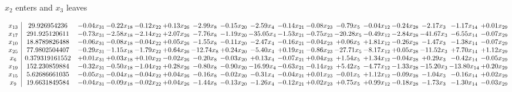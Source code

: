 \documentclass[9pt]{article}
\begin{document}
 $ x_{2} $ enters and $ x_{3} $ leaves 

 \[\begin{array}{c| c c@{\hskip 2pt} c@{\hskip 2pt} c@{\hskip 2pt} c@{\hskip 2pt} c@{\hskip 2pt} c@{\hskip 2pt} c@{\hskip 2pt} c@{\hskip 2pt} c@{\hskip 2pt} c@{\hskip 2pt} c@{\hskip 2pt} c@{\hskip 2pt} c@{\hskip 2pt} c@{\hskip 2pt} c@{\hskip 2pt} }
 x_{13}   &  29.926954236 & -0.04 x_{31} & -0.22 x_{18} & -0.12 x_{22} & +  0.13 x_{26} & -2.99 x_{8} & -0.15 x_{20} & -2.59 x_{4} & -0.14 x_{21} & -0.08 x_{23} & -0.79 x_{5} & -0.04 x_{12} & -0.24 x_{28} & -2.17 x_{3} & -1.17 x_{14} & +  0.01 x_{29}\\
 x_{17}   &  291.925120611 & -0.73 x_{31} & -2.58 x_{18} & -2.14 x_{22} & +  2.07 x_{26} & -7.76 x_{8} & -1.19 x_{20} & -35.05 x_{4} & -1.53 x_{21} & -0.75 x_{23} & -20.28 x_{5} & -0.49 x_{12} & -2.84 x_{28} & -41.67 x_{3} & -6.55 x_{14} & -0.07 x_{29}\\
 x_{10}   &  18.8789826488 & -0.06 x_{31} & -0.08 x_{18} & -0.04 x_{22} & +  0.05 x_{26} & -1.55 x_{8} & -0.11 x_{20} & -2.47 x_{4} & -0.16 x_{21} & -0.04 x_{23} & +  0.06 x_{5} & +  1.81 x_{12} & -0.26 x_{28} & -1.47 x_{3} & -1.38 x_{14} & -0.07 x_{29}\\
 x_{25}   &  77.9802504407 & -0.29 x_{31} & -1.15 x_{18} & -1.79 x_{22} & +  0.64 x_{26} & -12.74 x_{8} & +  0.24 x_{20} & -5.40 x_{4} & +  0.19 x_{21} & -0.86 x_{23} & -27.71 x_{5} & -8.17 x_{12} & +  0.05 x_{28} & -11.52 x_{3} & +  7.70 x_{14} & +  1.12 x_{29}\\
 x_{6}   &  0.379319161552 & +  0.01 x_{31} & +  0.03 x_{18} & +  0.10 x_{22} & -0.02 x_{26} & -0.20 x_{8} & -0.03 x_{20} & +  0.13 x_{4} & -0.07 x_{21} & +  0.04 x_{23} & +  1.54 x_{5} & +  1.34 x_{12} & -0.04 x_{28} & +  0.29 x_{3} & -0.42 x_{14} & -0.05 x_{29}\\
 x_{19}   &  152.230859884 & -0.32 x_{31} & -0.50 x_{18} & -1.04 x_{22} & +  0.28 x_{26} & -0.80 x_{8} & -0.90 x_{20} & -16.99 x_{4} & -0.63 x_{21} & -0.14 x_{23} & +  5.42 x_{5} & -4.77 x_{12} & -1.33 x_{28} & -15.20 x_{3} & -13.80 x_{14} & +  0.20 x_{29}\\
 x_{15}   &  5.62686661035 & -0.05 x_{31} & -0.04 x_{18} & -0.04 x_{22} & +  0.04 x_{26} & -0.16 x_{8} & -0.02 x_{20} & -0.31 x_{4} & -0.04 x_{21} & +  0.01 x_{23} & -0.01 x_{5} & +  1.12 x_{12} & -0.09 x_{28} & -1.04 x_{3} & -0.16 x_{14} & +  0.02 x_{29}\\
 x_{9}   &  19.6631849584 & -0.04 x_{31} & -0.09 x_{18} & -0.02 x_{22} & +  0.04 x_{26} & -1.44 x_{8} & -0.13 x_{20} & -1.26 x_{4} & -0.12 x_{21} & +  0.02 x_{23} & +  0.75 x_{5} & +  0.99 x_{12} & -0.18 x_{28} & -1.73 x_{3} & -1.30 x_{14} & -0.03 x_{29}\\

\end{array}\]
\end{document}
